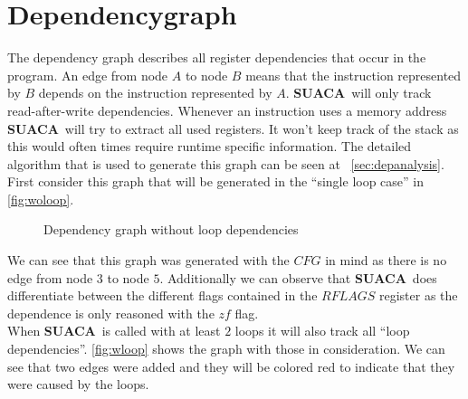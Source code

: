 \documentclass[a4paper,12pt,titlepage, twoside]{report}
\newcommand{\suaca}{\textbf{SUACA}}
\begin{document}
\FloatBarrier

\section{Dependencygraph}
The dependency graph describes all register dependencies that occur in the program. An edge from node $A$ to node $B$ means that the instruction represented by $B$ depends on the instruction represented by $A$. \suaca\ will only track read-after-write dependencies. Whenever an instruction uses a memory address \suaca\ will try to extract all used registers. It won't keep track of the stack as this would often times require runtime specific information. The detailed algorithm that is used to generate this graph can be seen at ~\autoref{sec:depanalysis}. First consider this graph that will be generated in the ``single loop case'' in \autoref{fig:woloop}.\\


\begin{figure}
\centering
{}
\caption{Dependency graph without loop dependencies}
\label{fig:woloop}
\end{figure}


We can see that this graph was generated with the $CFG$ in mind as there is no edge from node $3$ to node $5$. Additionally we can observe that \suaca\ does differentiate between the different flags contained in the $RFLAGS$ register as the dependence is only reasoned with the $zf$ flag.\\
When \suaca\ is called with at least $2$ loops it will also track all ``loop dependencies''. \autoref{fig:wloop} shows the graph with those in consideration. We can see that two edges were added and they will be colored red to indicate that they were caused by the loops.
\end{document}
